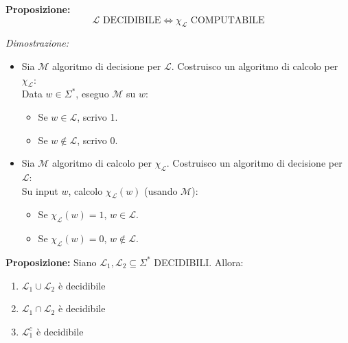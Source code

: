 \vspace{0.4cm}
\textbf{Proposizione:}
$$\mathcal{L} \text{ DECIDIBILE} \iff \chi_\mathcal{L} \text{ COMPUTABILE}$$

\textit{Dimostrazione:}
\begin{itemize}
    \item[$\implies$)] Sia $\mathcal{M}$ algoritmo di decisione per $\mathcal{L}$. Costruisco un algoritmo di calcolo per $\chi_\mathcal{L}$: \\
    Data $w \in \Sigma^*$, eseguo $\mathcal{M}$ su $w$:
    \begin{itemize}
        \item Se $w \in \mathcal{L}$, scrivo 1.
        \item Se $w \notin \mathcal{L}$, scrivo 0.
    \end{itemize}
    \item[$\impliedby$)] Sia $\mathcal{M}$ algoritmo di calcolo per $\chi_\mathcal{L}$. Costruisco un algoritmo di decisione per $\mathcal{L}$: \\
    Su input $w$, calcolo $\chi_\mathcal{L}(w)$ (usando $\mathcal{M}$):
    \begin{itemize}
        \item Se $\chi_\mathcal{L}(w) = 1$, $w \in \mathcal{L}$.
        \item Se $\chi_\mathcal{L}(w) = 0$, $w \notin \mathcal{L}$.
    \end{itemize}
\end{itemize}

\vspace{0.4cm}
\textbf{Proposizione:} Siano $\mathcal{L}_1, \mathcal{L}_2 \subseteq \Sigma^*$ DECIDIBILI. Allora:
\begin{enumerate}
    \item $\mathcal{L}_1 \cup \mathcal{L}_2$ è decidibile
    \item $\mathcal{L}_1 \cap \mathcal{L}_2$ è decidibile
    \item $\mathcal{L}_1^c$ è decidibile
\end{enumerate}

